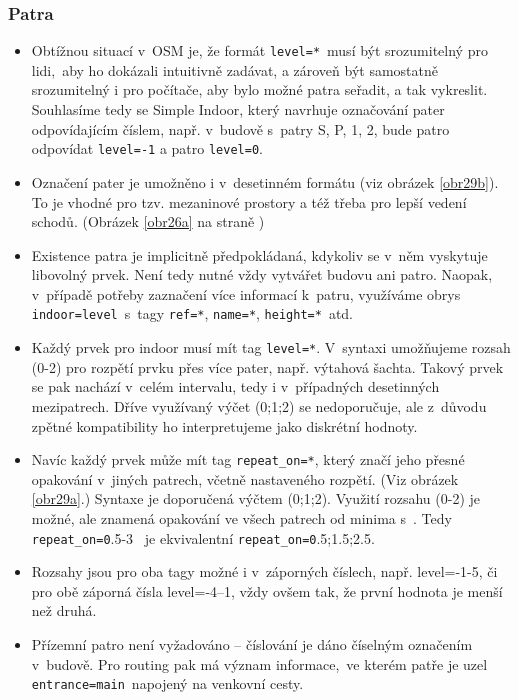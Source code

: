 \subsubsection*{Patra}\label{patra}

\begin{itemize}

\item
  Obtížnou situací v~OSM je, že formát \texttt{level=*}~musí být srozumitelný pro lidi,~aby ho dokázali intuitivně zadávat, a zároveň být samostatně srozumitelný i pro počítače, aby bylo možné patra seřadit, a tak vykreslit. Souhlasíme tedy se Simple Indoor, který navrhuje označování pater odpovídajícím číslem, např. v~budově s~patry S, P, 1, 2, bude patro  odpovídat \texttt{level=-1} a patro  \texttt{level=0}.
\item
  Označení pater je umožněno i v~desetinném formátu (viz obrázek \ref{obr29b}). To je vhodné pro tzv. mezaninové prostory a též třeba pro lepší vedení schodů. (Obrázek \ref{obr26a} na straně \pageref{obr26a})
\item
  Existence patra je implicitně předpokládaná, kdykoliv se v~něm vyskytuje libovolný prvek. Není tedy nutné vždy vytvářet budovu ani patro. Naopak, v~případě potřeby zaznačení více informací k~patru, využíváme obrys \texttt{indoor=level}~s~tagy \texttt{ref=*}, \texttt{name=*}, \texttt{height=*}~atd.
\item
  Každý prvek pro indoor musí mít tag \texttt{level=*}. V~syntaxi umožňujeme rozsah (0-2) pro rozpětí prvku přes více pater, např. výtahová šachta. Takový prvek se pak nachází v~celém intervalu, tedy i v~případných desetinných mezipatrech. Dříve využívaný výčet (0;1;2) se nedoporučuje, ale z~důvodu zpětné kompatibility ho interpretujeme jako diskrétní hodnoty.
\item
  Navíc každý prvek může mít tag \texttt{repeat\_on=*}, který značí jeho přesné opakování v~jiných patrech, včetně nastaveného rozpětí. (Viz obrázek \ref{obr29a}.) Syntaxe je doporučená výčtem (0;1;2). Využití rozsahu (0-2) je možné, ale znamená opakování ve všech patrech od minima s~. Tedy \texttt{repeat\_on=0}.5-3~ je ekvivalentní \texttt{repeat\_on=0}.5;1.5;2.5.
\item
  Rozsahy jsou pro oba tagy možné i v~záporných číslech, např. level=-1-5, či pro obě záporná čísla level=-4--1, vždy ovšem tak, že první hodnota je menší než druhá.
\item
  Přízemní patro není vyžadováno -- číslování je dáno číselným označením v~budově. Pro routing pak má význam informace,~ve kterém patře je uzel \texttt{entrance=main}~napojený na venkovní cesty.
\end{itemize}

